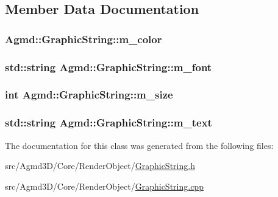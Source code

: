 \subsection{Member Data Documentation}
\hypertarget{class_agmd_1_1_graphic_string_a71a19501502304fa5ed6727d8d07b1da}{
\subsubsection[{m\+\_\+color}]{ Agmd\+::\+Graphic\+String\+::m\+\_\+color}}\label{class_agmd_1_1_graphic_string_a71a19501502304fa5ed6727d8d07b1da}
\hypertarget{class_agmd_1_1_graphic_string_a753dfe02c6197464de4b71f6cb8a0aa6}{
\subsubsection[{m\+\_\+font}]{\setlength{\rightskip}{0pt plus 5cm}std\+::string Agmd\+::\+Graphic\+String\+::m\+\_\+font}}\label{class_agmd_1_1_graphic_string_a753dfe02c6197464de4b71f6cb8a0aa6}
\hypertarget{class_agmd_1_1_graphic_string_a636e8c8552891a616c5ea59ad71349d4}{
\subsubsection[{m\+\_\+size}]{\setlength{\rightskip}{0pt plus 5cm}int Agmd\+::\+Graphic\+String\+::m\+\_\+size}}\label{class_agmd_1_1_graphic_string_a636e8c8552891a616c5ea59ad71349d4}
\hypertarget{class_agmd_1_1_graphic_string_aed2cd074b2c44f30386e9b611e0a8fad}{
\subsubsection[{m\+\_\+text}]{\setlength{\rightskip}{0pt plus 5cm}std\+::string Agmd\+::\+Graphic\+String\+::m\+\_\+text}}\label{class_agmd_1_1_graphic_string_aed2cd074b2c44f30386e9b611e0a8fad}


The documentation for this class was generated from the following files\+:\begin{DoxyCompactItemize}
\item 
src/\+Agmd3\+D/\+Core/\+Render\+Object/\hyperlink{_graphic_string_8h}{Graphic\+String.\+h}\item 
src/\+Agmd3\+D/\+Core/\+Render\+Object/\hyperlink{_graphic_string_8cpp}{Graphic\+String.\+cpp}\end{DoxyCompactItemize}
